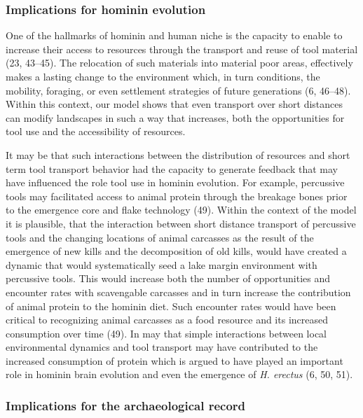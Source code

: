 \documentclass[9pt,twocolumn,twoside,]{pnas-new}
\begin{document}
\hypertarget{implications-for-hominin-evolution}{%
\subsubsection{Implications for hominin
evolution}\label{implications-for-hominin-evolution}}

One of the hallmarks of hominin and human niche is the capacity to
enable to increase their access to resources through the transport and
reuse of tool material (23, 43--45). The relocation of such materials
into material poor areas, effectively makes a lasting change to the
environment which, in turn conditions, the mobility, foraging, or even
settlement strategies of future generations (6, 46--48). Within this
context, our model shows that even transport over short distances can
modify landscapes in such a way that increases, both the opportunities
for tool use and the accessibility of resources.

It may be that such interactions between the distribution of resources
and short term tool transport behavior had the capacity to generate
feedback that may have influenced the role tool use in hominin
evolution. For example, percussive tools may facilitated access to
animal protein through the breakage bones prior to the emergence core
and flake technology (49). Within the context of the model it is
plausible, that the interaction between short distance transport of
percussive tools and the changing locations of animal carcasses as the
result of the emergence of new kills and the decomposition of old kills,
would have created a dynamic that would systematically seed a lake
margin environment with percussive tools. This would increase both the
number of opportunities and encounter rates with scavengable carcasses
and in turn increase the contribution of animal protein to the hominin
diet. Such encounter rates would have been critical to recognizing
animal carcasses as a food resource and its increased consumption over
time (49). In may that simple interactions between local environmental
dynamics and tool transport may have contributed to the increased
consumption of protein which is argued to have played an important role
in hominin brain evolution and even the emergence of \emph{H. erectus}
(6, 50, 51).

\hypertarget{implications-for-the-archaeological-record}{%
\subsubsection{Implications for the archaeological
record}\label{implications-for-the-archaeological-record}}
\end{document}
